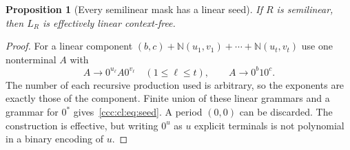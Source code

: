 \documentclass[11pt,letterpaper]{article}
\newtheorem{proposition}[theorem]{Proposition}
\theoremstyle{definition}
\theoremstyle{remark}
\newcommand{\N}{\mathbb N}
\begin{document}
\begin{proposition}[Every semilinear mask has a linear seed]\label{ccc:cl:prop:linear-seed}
If $R$ is semilinear, then $L_R$ is effectively linear context-free.
\end{proposition}
\begin{proof}
For a linear component
$(b,c)+\N(u_1,v_1)+\cdots+\N(u_t,v_t)$ use one nonterminal $A$ with
\[
 A\longrightarrow 0^{u_\ell}A0^{v_\ell}\quad(1\le\ell\le t),
 \qquad A\longrightarrow 0^b1 0^c.
\]
The number of each recursive production used is arbitrary, so the
exponents are exactly those of the component. Finite union of these
linear grammars and a grammar for $0^*$ gives~\eqref{ccc:cl:eq:seed}.
A period $(0,0)$ can be discarded. The construction is effective, but
writing $0^u$ as $u$ explicit terminals is not polynomial in a binary
encoding of $u$.
\end{proof}
\end{document}
